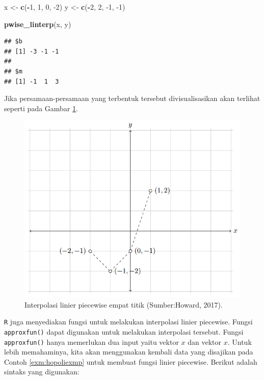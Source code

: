 \documentclass[]{book}
\newenvironment{Shaded}{\begin{snugshade}}{\end{snugshade}}
\newcommand{\DecValTok}[1]{\textcolor[rgb]{0.00,0.00,0.81}{#1}}
\newcommand{\KeywordTok}[1]{\textcolor[rgb]{0.13,0.29,0.53}{\textbf{#1}}}
\newcommand{\NormalTok}[1]{#1}
\newcommand{\OperatorTok}[1]{\textcolor[rgb]{0.81,0.36,0.00}{\textbf{#1}}}
\newcommand{\StringTok}[1]{\textcolor[rgb]{0.31,0.60,0.02}{#1}}
\theoremstyle{definition}
\theoremstyle{definition}
\theoremstyle{definition}
\theoremstyle{remark}
\begin{document}
\begin{Shaded}
\begin{Highlighting}[]
\NormalTok{x <-}\StringTok{ }\KeywordTok{c}\NormalTok{(}\OperatorTok{-}\DecValTok{1}\NormalTok{, }\DecValTok{1}\NormalTok{, }\DecValTok{0}\NormalTok{, }\DecValTok{-2}\NormalTok{)}
\NormalTok{y <-}\StringTok{ }\KeywordTok{c}\NormalTok{(}\OperatorTok{-}\DecValTok{2}\NormalTok{, }\DecValTok{2}\NormalTok{, }\DecValTok{-1}\NormalTok{, }\DecValTok{-1}\NormalTok{)}

\KeywordTok{pwise_linterp}\NormalTok{(x, y)}
\end{Highlighting}
\end{Shaded}

\begin{verbatim}
## $b
## [1] -3 -1 -1
## 
## $m
## [1] -1  1  3
\end{verbatim}

Jika persamaan-persamaan yang terbentuk tersebut divisualisasikan akan terlihat seperti pada Gambar \ref{fig:pwiselinviz}.

\begin{figure}

{\centering \includegraphics[width=0.8\linewidth]{./images/pwiselinviz} 

}

\caption{Interpolasi linier piecewise empat titik 
(Sumber:Howard, 2017).}\label{fig:pwiselinviz}
\end{figure}

\texttt{R} juga menyediakan fungsi untuk melakukan interpolasi linier piecewise. Fungsi \texttt{approxfun()} dapat digunakan untuk melakukan interpolasi tersebut. Fungsi \texttt{approxfun()} hanya memerlukan dua input yaitu vektor \(x\) dan vektor \(x\). Untuk lebih memahaminya, kita akan menggunakan kembali data yang disajikan pada Contoh \ref{exm:hopoliexmp} untuk membuat fungsi linier piecewise. Berikut adalah sintaks yang digunakan:
\end{document}
